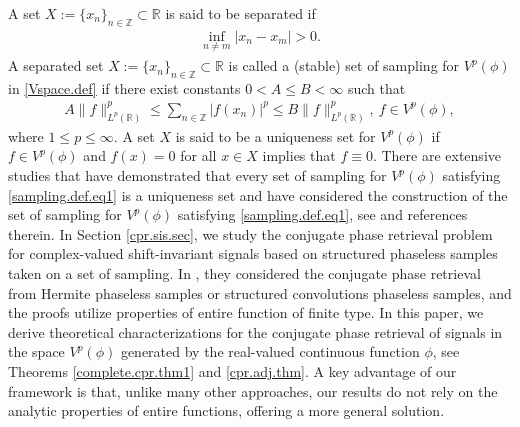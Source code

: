 \documentclass[12pt,oneside,reqno]{amsart}
\newcommand{\Z}{\mathbb{Z}}
\newcommand{\R}{\mathbb{R}}
\newcommand{\C}{\mathbb{C}}
\numberwithin{equation}{section}
\begin{document}
	
	
	
	
	A set $X:=\{x_n\}_{n\in \Z} \subset \R$ is said to be separated if
	\begin{align*}
		\inf_{n\ne m} |x_n-x_m|>0.
	\end{align*}
	A separated set $X:=\{x_n\}_{n\in \Z} \subset \R$ is called a (stable) set of sampling for $V^p(\phi)$  in \eqref{Vspace.def} if there exist constants $0<A\le B<\infty$ such that
	\begin{align}\label{sampling.def.eq1}
		A\|f\|_{L^p(\R)}^p\le \sum_{n\in \Z} |f(x_n)|^p \le B\|f\|_{L^p(\R)}^p, \ f\in V^p(\phi), 
	\end{align}
	where $1\le p\le \infty$. 
	A set $X$ is said to be a uniqueness set for $V^p(\phi)$ if $f\in V^p(\phi)$ and $f(x)= 0$ for all $x\in X$ implies that $f\equiv 0$. 
    There are  extensive studies that have demonstrated that every set of sampling for $V^p(\phi)$ satisfying \eqref{sampling.def.eq1} is a  uniqueness set and have considered the construction of the set of sampling for $V^p(\phi)$ satisfying \eqref{sampling.def.eq1}, see  \cite{aldroubi2000beurling, aldroubi2001nonuniform,aldroubi2005convolution,benedetto1992irregular, benedetto2001modern, grochenig2001foundations, grochenig2018sampling,higgins1996sampling,unser2000sampling,young2001introduction} and references therein.  
  In Section \ref{cpr.sis.sec}, we study the conjugate phase retrieval problem for complex-valued shift-invariant signals based on structured phaseless samples taken on a set of sampling.  In \cite{chen2024conjugate,chen2023conjugate,lai2021conjugate, mc2004phase}, they considered the conjugate phase retrieval from Hermite phaseless samples or structured convolutions  phaseless samples, and the proofs  utilize properties of  entire function of finite type. In this paper,  we derive theoretical characterizations for the conjugate phase retrieval of signals in the space $V^p(\phi)$ generated by the real-valued continuous function $\phi$,  see Theorems \ref{complete.cpr.thm1} and \ref{cpr.adj.thm}.   A key advantage of our framework is that, unlike many other approaches, our results do not rely on the analytic properties of entire functions, offering a more general solution.
\end{document}
